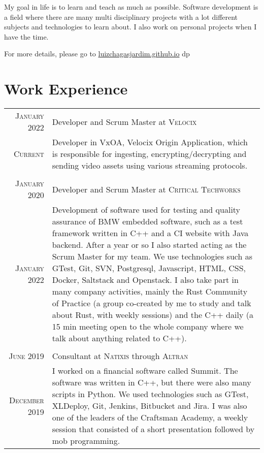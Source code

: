 \documentclass[a4paper,10pt]{article}
\newcommand{\cvtype}{d}
\begin{document}
{\quad}My goal in life is to learn and teach as much as possible. Software development is a field where there are many multi disciplinary projects with a lot different subjects and technologies to learn about. I also work on personal projects when I have the time.

{\quad}\footnotesize{For more details, please go to \href{http://luizchagasjardim.github.io}{luizchagasjardim.github.io}}
\else
	\if \cvtype p 

	\fi
\fi

\section{Work Experience}
\begin{tabular}{r|p{11cm}}

\textsc{January 2022} & Developer and Scrum Master at \textsc{Velocix}\\
\textsc{Current} & Developer in VxOA, Velocix Origin Application, which is responsible for ingesting, encrypting/decrypting and sending video assets using various streaming protocols.\\

\multicolumn{2}{c}{}\\


\textsc{January 2020} & Developer and Scrum Master at \textsc{Critical Techworks}\\
\textsc{January 2022} & Development of software used for testing and quality assurance of BMW embedded software, such as a test framework written in C++ and a CI website with Java backend. After a year or so I also started acting as the Scrum Master for my team. We use technologies such as GTest, Git, SVN, Postgresql, Javascript, HTML, CSS, Docker, Saltstack and Openstack. I also take part in many company activities, mainly the Rust Community of Practice (a group co-created by me to study and talk about Rust, with weekly sessions) and the C++ daily (a 15 min meeting open to the whole company where we talk about anything related to C++).\\

\multicolumn{2}{c}{}\\


\textsc{June 2019} & Consultant at \textsc{Natixis} through \textsc{Altran}\\
\textsc{December 2019} & I worked on a financial software called Summit. The software was written in C++, but there were also many scripts in Python. We used technologies such as GTest, XLDeploy, Git, Jenkins, Bitbucket and Jira. I was also one of the leaders of the Craftsman Academy, a weekly session that consisted of a short presentation followed by mob programming.\\


\end{tabular}
\end{document}
